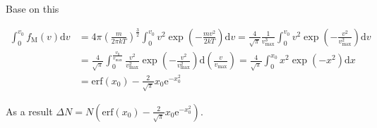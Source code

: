 \documentclass[a4paper,11pt]{amsart}
\theoremstyle{definition}
\begin{document}
	Base on this
	
	\begin{align}
		\int_0^{v_0}{f_{\mathrm{M}}\left( v \right) \mathrm{d}v}&=4\pi \left( \frac{m}{2\pi kT} \right) ^{\tfrac{3}{2}}\int_0^{v_0}{v^2\exp \left( -\frac{mv^2}{2kT} \right) \mathrm{d}v}=\frac{4}{\sqrt{\pi}}\frac{1}{v_{\max}^{3}}\int_0^{v_0}{v^2\exp \left( -\frac{v^2}{v_{\max}^{2}} \right) \mathrm{d}v}\\
		&=\frac{4}{\sqrt{\pi}}\int_0^{\frac{v_0}{v_{\max}}}{\frac{v^2}{v_{\max}^{2}}\exp \left( -\frac{v^2}{v_{\max}^{2}} \right) \mathrm{d}\left( \frac{v}{v_{\max}} \right)}=\frac{4}{\sqrt{\pi}}\int_0^{x_0}{x^2\exp \left( -x^2 \right) \mathrm{d}x}\\
		&=\mathrm{erf}\left( x_0 \right) -\frac{2}{\sqrt{\pi}}x_0\mathrm{e}^{-x_{0}^{2}}
	\end{align}
	
	As a result $\displaystyle\Delta N=N\left( \mathrm{erf}\left( x_0 \right) -\frac{2}{\sqrt{\pi}}x_0\mathrm{e}^{-x_{0}^{2}}\right) $.
	
\end{document}
